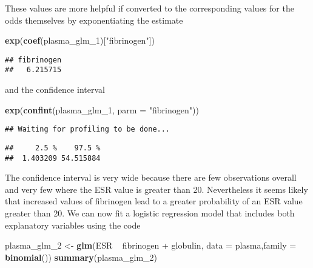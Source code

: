 \documentclass[]{article}
\newenvironment{Shaded}{\begin{snugshade}}{\end{snugshade}}
\newcommand{\KeywordTok}[1]{\textcolor[rgb]{0.13,0.29,0.53}{\textbf{{#1}}}}
\newcommand{\DataTypeTok}[1]{\textcolor[rgb]{0.13,0.29,0.53}{{#1}}}
\newcommand{\StringTok}[1]{\textcolor[rgb]{0.31,0.60,0.02}{{#1}}}
\newcommand{\NormalTok}[1]{{#1}}
\numberwithin{equation}{section}
\begin{document}
These values are more helpful if converted to the corresponding values
for the odds themselves by exponentiating the estimate

\begin{Shaded}
\begin{Highlighting}[]
\KeywordTok{exp}\NormalTok{(}\KeywordTok{coef}\NormalTok{(plasma_glm_1)[}\StringTok{"fibrinogen"}\NormalTok{])}
\end{Highlighting}
\end{Shaded}

\begin{verbatim}
## fibrinogen 
##   6.215715
\end{verbatim}

and the confidence interval

\begin{Shaded}
\begin{Highlighting}[]
\KeywordTok{exp}\NormalTok{(}\KeywordTok{confint}\NormalTok{(plasma_glm_1, }\DataTypeTok{parm =} \StringTok{"fibrinogen"}\NormalTok{))}
\end{Highlighting}
\end{Shaded}

\begin{verbatim}
## Waiting for profiling to be done...
\end{verbatim}

\begin{verbatim}
##     2.5 %    97.5 % 
##  1.403209 54.515884
\end{verbatim}

The confidence interval is very wide because there are few observations
overall and very few where the ESR value is greater than 20.
Nevertheless it seems likely that increased values of fibrinogen lead to
a greater probability of an ESR value greater than 20. We can now fit a
logistic regression model that includes both explanatory variables using
the code

\begin{Shaded}
\begin{Highlighting}[]
\NormalTok{plasma_glm_2 <-}\StringTok{ }\KeywordTok{glm}\NormalTok{(ESR ~}\StringTok{ }\NormalTok{fibrinogen +}\StringTok{ }\NormalTok{globulin, }\DataTypeTok{data =} \NormalTok{plasma,}\DataTypeTok{family =} \KeywordTok{binomial}\NormalTok{())}
\KeywordTok{summary}\NormalTok{(plasma_glm_2)}
\end{Highlighting}
\end{Shaded}
\end{document}
